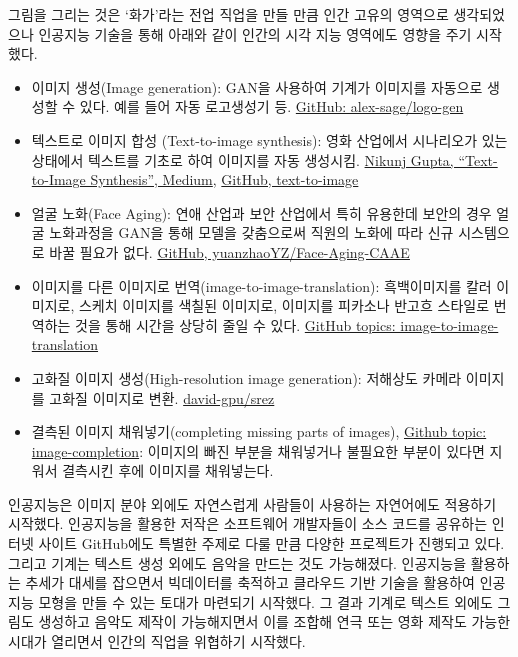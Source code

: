 \documentclass[smallextended]{svjour3}       %
\begin{document}
그림을 그리는 것은 `화가'라는 전업 직업을 만들 만큼 인간 고유의 영역으로
생각되었으나 인공지능 기술을 통해 아래와 같이 인간의 시각 지능 영역에도
영향을 주기 시작했다.

\begin{itemize}
\item
  이미지 생성(Image generation): GAN을 사용하여 기계가 이미지를 자동으로
  생성할 수 있다. 예를 들어 자동 로고생성기 등.
  \href{https://github.com/alex-sage/logo-gen}{GitHub:
  alex-sage/logo-gen}
\item
  텍스트로 이미지 합성 (Text-to-image synthesis): 영화 산업에서
  시나리오가 있는 상태에서 텍스트를 기초로 하여 이미지를 자동 생성시킴.
  \href{https://medium.com/datadriveninvestor/text-to-image-synthesis-6e5de1bf86ec}{Nikunj
  Gupta, ``Text-to-Image Synthesis'', Medium},
  \href{https://github.com/crisbodnar/text-to-image}{GitHub,
  text-to-image}
\item
  얼굴 노화(Face Aging): 연애 산업과 보안 산업에서 특히 유용한데 보안의
  경우 얼굴 노화과정을 GAN을 통해 모델을 갖춤으로써 직원의 노화에 따라
  신규 시스템으로 바꿀 필요가 없다.
  \href{https://github.com/yuanzhaoYZ/Face-Aging-CAAE}{GitHub,
  yuanzhaoYZ/Face-Aging-CAAE}
\item
  이미지를 다른 이미지로 번역(image-to-image-translation): 흑백이미지를
  칼러 이미지로, 스케치 이미지를 색칠된 이미지로, 이미지를 피카소나
  반고흐 스타일로 번역하는 것을 통해 시간을 상당히 줄일 수 있다.
  \href{https://github.com/topics/image-to-image-translation}{GitHub
  topics: image-to-image-translation}
\item
  고화질 이미지 생성(High-resolution image generation): 저해상도 카메라
  이미지를 고화질 이미지로 변환.
  \href{https://github.com/david-gpu/srez}{david-gpu/srez}
\item
  결측된 이미지 채워넣기(completing missing parts of images),
  \href{https://github.com/topics/image-completion}{Github topic:
  image-completion}: 이미지의 빠진 부분을 채워넣거나 불필요한 부분이
  있다면 지워서 결측시킨 후에 이미지를 채워넣는다.
\end{itemize}

인공지능은 이미지 분야 외에도 자연스럽게 사람들이 사용하는 자연어에도
적용하기 시작했다. 인공지능을 활용한 저작은 소프트웨어 개발자들이 소스
코드를 공유하는 인터넷 사이트 GitHub에도 특별한 주제로 다룰 만큼 다양한
프로젝트가 진행되고 있다. 그리고 기계는 텍스트 생성 외에도 음악을 만드는
것도 가능해졌다. 인공지능을 활용하는 추세가 대세를 잡으면서 빅데이터를
축적하고 클라우드 기반 기술을 활용하여 인공지능 모형을 만들 수 있는
토대가 마련되기 시작했다. 그 결과 기계로 텍스트 외에도 그림도 생성하고
음악도 제작이 가능해지면서 이를 조합해 연극 또는 영화 제작도 가능한
시대가 열리면서 인간의 직업을 위협하기 시작했다.
\end{document}

